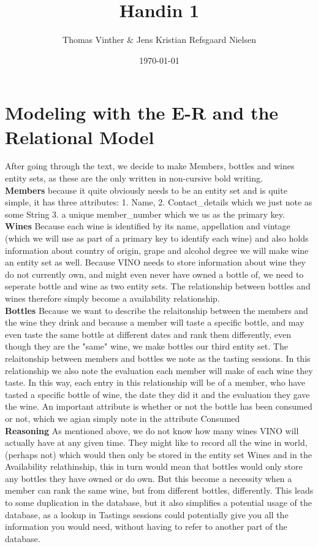 \documentclass{article}
\theoremstyle{remark}
\numberwithin{equation}{section}
\begin{document}
	\author{Thomas Vinther \& Jens Kristian Refsgaard Nielsen}
	\title{Handin 1}
	\date{\today}
	\maketitle
	\section{Modeling with the E-R and the Relational Model}
	After going through the text, we decide to make Members, bottles and wines entity sets, as these are the only written in non-cursive bold writing.\\	
	
	\textbf{Members} because it quite obviously needs to be an entity set and is quite simple, it has three attributes: 1. Name, 2. Contact\_details which we just note as some String 3. a unique member\_number which we us as the primary key.\\
	
	\textbf{Wines} Because each wine is identified by its name, appellation and vintage (which we will use as part of a primary key to identify each wine) and also holds information about country of origin, grape and alcohol degree we will make wine an entity set as well. Because VINO needs to store information about wine they do not currently own, and might even never have owned a bottle of, we need to seperate bottle and wine as two entity sets. The relationship between bottles and wines therefore simply become a availability relationship. \\
	
	\textbf{Bottles} Because we want to describe the relaitonship between the members and the wine they drink and because a member will taste a specific bottle, and may even taste the same bottle at different dates and rank them differently, even though they are the "same" wine, we make bottles our third entity set. The relaitonship between members and bottles we note as the tasting sessions. In this relationship we also note the evaluation each member will make of each wine they taste. In this way, each entry in this relationship will be of a member, who have tasted a specific bottle of wine, the date they did it and the evaluation they gave the wine. An important attribute is whether or not the bottle has been consumed or not, which we agian simply note in the attribute Consumed\\
	
	\textbf{Reasoning} As mentioned above, we do not know how many wines VINO will actually have at any given time. They might like to record all the wine in world, (perhaps not) which would then only be stored in the entity set Wines and in the Availability relathinship, this in turn would mean that bottles would only store any bottles they have owned or do own. But this become a necessity when a member can rank the same wine, but from different bottles, differently. This leads to some duplication in the database, but it also simplifies a potential usage of the database, as a lookup in Tastings sessions could potentially give you all the information you would need, without having to refer to another part of the database.\\
	
\end{document}
